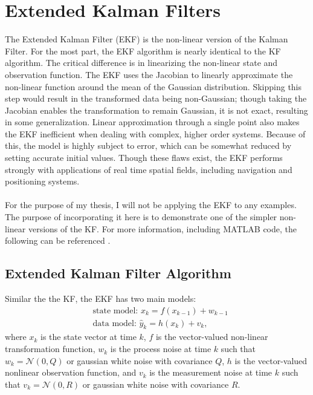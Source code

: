 \chapter{Extended Kalman Filters}
\label{Extended Kalman Filters}

The Extended Kalman Filter (EKF) is the non-linear version of the Kalman Filter. For the most part, the EKF algorithm is nearly identical to the KF algorithm. The critical difference is in linearizing the non-linear state and observation function. The EKF uses the Jacobian to linearly approximate the non-linear function around the mean of the Gaussian distribution. Skipping this step would result in the transformed data being non-Gaussian; though taking the Jacobian enables the transformation to remain Gaussian, it is not exact, resulting in some generalization. Linear approximation through a single point also makes the EKF inefficient when dealing with complex, higher order systems. Because of this, the model is highly subject to error, which can be somewhat reduced by setting accurate initial values. Though these flaws exist, the EKF performs strongly with applications of real time spatial fields, including navigation and positioning systems.  \\ \\
For the purpose of my thesis, I will not be applying the EKF to any examples. The purpose of incorporating it here is to demonstrate one of the simpler non-linear versions of the KF. For more information, including MATLAB code, the following can be referenced \cite{cao_2008, Chadaporn, article7}.

\section{Extended Kalman Filter Algorithm}
Similar the the KF, the EKF has two main models:
\begin{align*}
&\text{state model: }  x_{k} = f( x_{k-1}) + w_{k-1}\\
&\text{data model: }  \hat y_k = h( x_k) + v_k,
\end{align*}
where $x_k$ is the state vector at time $k$, $f$ is the vector-valued non-linear transformation function, $w_k$ is the process noise at time $k$ such that $w_k = \mathcal{N}(0, Q)$ or  gaussian white noise with covariance $Q$, $h$ is the vector-valued nonlinear observation function, and $v_k$ is the measurement noise at time $k$ such that $v_k = \mathcal{N}(0, R)$ or gaussian white noise with covariance $R$. \\

